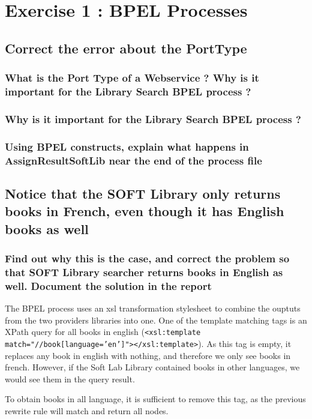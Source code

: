 \section{Exercise 1 : BPEL Processes}

\subsection{Correct the error about the PortType}
    \subsubsection{What is the Port Type of a Webservice ? Why is it important for the Library
    Search BPEL process ?}

    \subsubsection{Why is it important for the Library
    Search BPEL process ?}

    \subsubsection{Using BPEL constructs, explain what happens in AssignResultSoftLib near
    the end of the process file}

\subsection{Notice that the SOFT Library only returns books in French, even though it has English books as well}

\subsubsection{Find out why this is the case, and correct the problem so that SOFT Library searcher returns books in English as well. Document the solution in the
report}

The BPEL process uses an xsl transformation stylesheet to combine the ouptuts from the two providers libraries into one. One of the template matching tags is an XPath query for all books in english (\texttt{<xsl:template match="//book[language='en']"></xsl:template>}). As this tag is empty, it replaces any book in english with nothing, and therefore we only see books in french. However, if the Soft Lab Library contained books in other languages, we would see them in the query result.

To obtain books in all language, it is sufficient to remove this tag, as the previous rewrite rule will match and return all nodes.

